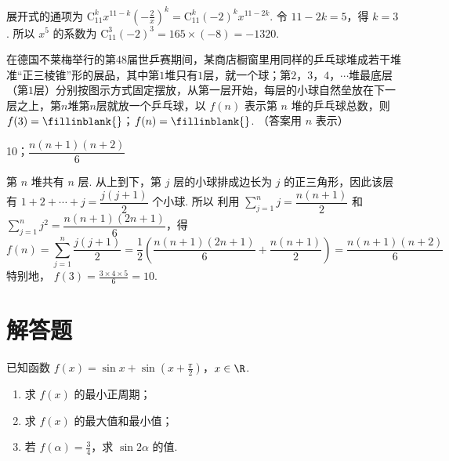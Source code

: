 \begin{solution}
展开式的通项为 \(\mathrm C_{11}^{k}x^{11-k}\left(-\frac{2}{x}\right)^k=\mathrm C_{11}^{k}(-2)^k x^{11-2k}\). 令 \(11-2k=5\)，得 \(k=3\). 所以 \(x^5\) 的系数为 \(\mathrm C_{11}^{3}(-2)^3=165\times(-8)=-1320\).
\end{solution}

\begin{problem}
在德国不莱梅举行的第48届世乒赛期间，某商店橱窗里用同样的乒乓球堆成若干堆准“正三棱锥”形的展品，其中第\(1\)堆只有\(1\)层，就一个球；第\(2\)，\(3\)，\(4\)，\(\cdots\)堆最底层（第\(1\)层）分别按图示方式固定摆放，从第一层开始，每层的小球自然垒放在下一层之上，第\(n\)堆第\(n\)层就放一个乒乓球，以 \(f(n)\) 表示第 \(n\) 堆的乒乓球总数，则 \(f(3)=\fillinblank{}\)；\(f(n)=\fillinblank{}\). （答案用 \(n\) 表示）

\end{problem}

\begin{answer}
10；\(\dfrac{n(n+1)(n+2)}{6}\)
\end{answer}

\begin{solution}
第 \(n\) 堆共有 \(n\) 层. 从上到下，第 \(j\) 层的小球排成边长为 \(j\) 的正三角形，因此该层有
\(1+2+\cdots+j=\dfrac{j(j+1)}{2}\) 个小球. 所以
利用 \(\sum_{j=1}^{n}j=\dfrac{n(n+1)}{2}\) 和
\(\sum_{j=1}^{n}j^2=\dfrac{n(n+1)(2n+1)}{6}\)，得
\[
f(n)=\sum_{j=1}^{n}\frac{j(j+1)}{2}
 =\frac12\left(\frac{n(n+1)(2n+1)}{6}+\frac{n(n+1)}{2}\right)
 =\frac{n(n+1)(n+2)}{6}
\]
特别地，
\(f(3)=\frac{3\times4\times5}{6}=10\).
\end{solution}

\section{解答题}
\begin{problem}
已知函数 \(f(x) = \sin x + \sin \left(x + \frac{\pi}{2}\right)\)，\(x \in \R\).

\begin{enumerate}
\item 求 \( f(x) \) 的最小正周期；
\item 求 \( f(x) \) 的最大值和最小值；
\item 若 \( f(\alpha)=\frac{3}{4} \)，求 \( \sin 2\alpha \) 的值.
\end{enumerate}
\end{problem}

